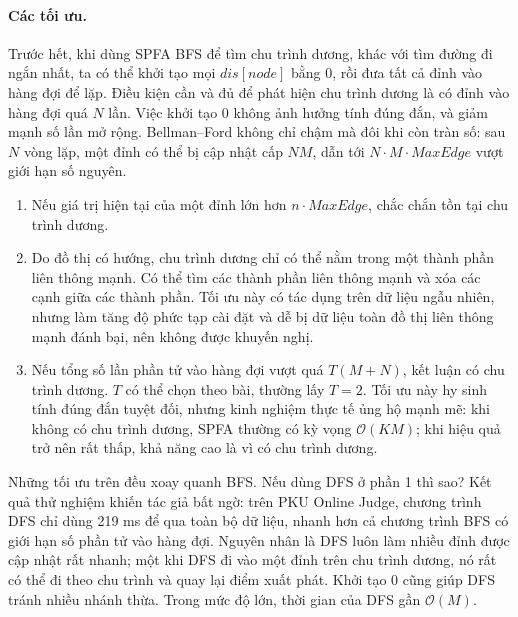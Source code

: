 \documentclass[11pt]{article}
\newcommand{\Oh}{\mathcal{O}}
\begin{document}
\paragraph{Các tối ưu.}
Trước hết, khi dùng SPFA BFS để tìm chu trình dương, khác với tìm đường đi
ngắn nhất, ta có thể khởi tạo mọi \(\mathit{dis}[\mathit{node}]\) bằng 0, rồi
đưa tất cả đỉnh vào hàng đợi để lặp. Điều kiện cần và đủ để phát hiện chu
trình dương là có đỉnh vào hàng đợi quá \(N\) lần. Việc khởi tạo 0 không ảnh
hưởng tính đúng đắn, và giảm mạnh số lần mở rộng. Bellman--Ford không chỉ
chậm mà đôi khi còn tràn số: sau \(N\) vòng lặp, một đỉnh có thể bị cập nhật
cấp \(NM\), dẫn tới \(N\cdot M\cdot \mathit{MaxEdge}\) vượt giới hạn số
nguyên.

\begin{enumerate}
  \item Nếu giá trị hiện tại của một đỉnh lớn hơn \(n\cdot \mathit{MaxEdge}\),
  chắc chắn tồn tại chu trình dương.

  \item Do đồ thị có hướng, chu trình dương chỉ có thể nằm trong một thành
  phần liên thông mạnh. Có thể tìm các thành phần liên thông mạnh và xóa các
  cạnh giữa các thành phần. Tối ưu này có tác dụng trên dữ liệu ngẫu nhiên,
  nhưng làm tăng độ phức tạp cài đặt và dễ bị dữ liệu toàn đồ thị liên thông
  mạnh đánh bại, nên không được khuyến nghị.

  \item Nếu tổng số lần phần tử vào hàng đợi vượt quá \(T(M+N)\), kết luận có
  chu trình dương. \(T\) có thể chọn theo bài, thường lấy \(T=2\). Tối ưu này
  hy sinh tính đúng đắn tuyệt đối, nhưng kinh nghiệm thực tế ủng hộ mạnh mẽ:
  khi không có chu trình dương, SPFA thường có kỳ vọng \(\Oh(KM)\); khi hiệu
  quả trở nên rất thấp, khả năng cao là vì có chu trình dương.
\end{enumerate}

Những tối ưu trên đều xoay quanh BFS. Nếu dùng DFS ở phần 1 thì sao? Kết quả
thử nghiệm khiến tác giả bất ngờ: trên PKU Online Judge, chương trình DFS chỉ
dùng 219 ms để qua toàn bộ dữ liệu, nhanh hơn cả chương trình BFS có giới hạn
số phần tử vào hàng đợi. Nguyên nhân là DFS luôn làm nhiều đỉnh được cập nhật
rất nhanh; một khi DFS đi vào một đỉnh trên chu trình dương, nó rất có thể đi
theo chu trình và quay lại điểm xuất phát. Khởi tạo 0 cũng giúp DFS tránh
nhiều nhánh thừa. Trong mức độ lớn, thời gian của DFS gần \(\Oh(M)\).
\end{document}
